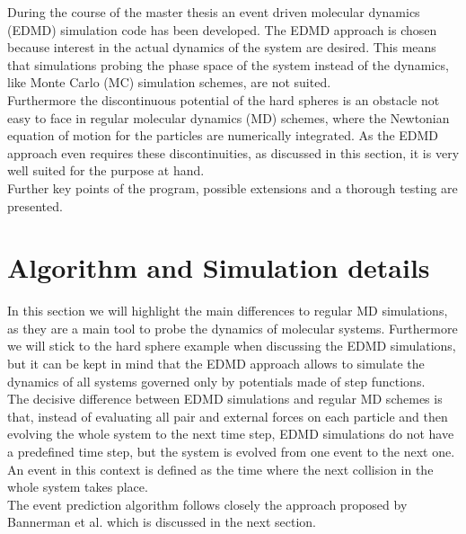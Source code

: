 
\label{chp:simulation}
During the course of the master thesis an event driven molecular dynamics (EDMD) simulation code has been developed. The EDMD approach is chosen because interest in the actual dynamics of the system are desired. This means that simulations probing the phase space of the system instead of the dynamics, like Monte Carlo (MC) simulation schemes, are not suited.\\ 
Furthermore the discontinuous potential of the hard spheres is an obstacle not easy to face in regular molecular dynamics (MD) schemes, where the Newtonian equation of motion for the particles are numerically integrated. As the EDMD approach even requires these discontinuities, as discussed in this section, it is very well suited for the purpose at hand.\\ 
Further key points of the program, possible extensions and a thorough testing are presented.\\

\section{Algorithm and Simulation details}
\label{sec:simulation}
In this section we will highlight the main differences to regular MD simulations, as they are a main tool to probe the dynamics of molecular systems. Furthermore we will stick to the hard sphere example when discussing the EDMD simulations, but it can be kept in mind that the EDMD approach allows to simulate the dynamics of all systems governed only by potentials made of step functions.\\
 
The decisive difference between EDMD simulations and regular MD schemes is that, instead of evaluating all pair and external forces on each particle and then evolving the whole system to the next time step, EDMD simulations do not have a predefined time step, but the system is evolved from one event to the next one. An event in this context is defined as the time where the next collision in the whole system takes place.\\

The event prediction algorithm follows closely the approach proposed by Bannerman et al. \cite{Bannerman2014} which is discussed in the next section.\\

